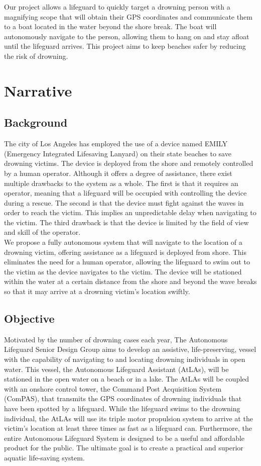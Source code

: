 \documentclass[11pt]{article}
\begin{document}
Our project allows a lifeguard to quickly target a drowning person with a magnifying scope that will obtain their GPS coordinates and communicate them to a boat located in the water beyond the shore break. The boat will autonomously navigate to the person, allowing them to hang on and stay afloat until the lifeguard arrives. This project aims to keep beaches safer by reducing the risk of drowning. 


\section*{Narrative}

\subsection*{Background}
The city of Los Angeles has employed the use of a device named EMILY (Emergency Integrated Lifesaving Lanyard) on their state beaches to save drowning victims. The device is deployed from the shore and remotely controlled by a human operator. Although it offers a degree of assistance, there exist multiple drawbacks to the system as a whole. The first is that it requires an operator, meaning that a lifeguard will be occupied with controlling the device during a rescue. The second is that the device must fight against the waves in order to reach the victim. This implies an unpredictable delay when navigating to the victim. The third drawback is that the device is limited by the field of view and skill of the operator.\\

We propose a fully autonomous system that will navigate to the location of a drowning victim, offering assistance as a lifeguard is deployed from shore. This eliminates the need for a human operator, allowing the lifeguard to swim out to the victim as the device navigates to the victim. The device will be stationed within the water at a certain distance from the shore and beyond the wave breaks so that it may arrive at a drowning victim's location swiftly.

\subsection*{Objective}

Motivated by the number of drowning cases each year, The Autonomous Lifeguard Senior Design Group aims to develop an assistive, life-preserving, vessel with the capability of navigating to and locating drowning individuals in open water. This vessel, the Autonomous Lifeguard Assistant (AtLAs), will be stationed in the open water on a beach or in a lake. The AtLAs will be coupled with an onshore control tower, the Command Post Acquisition System (ComPAS), that transmits the GPS coordinates of drowning individuals that have been spotted by a lifeguard. While the lifeguard swims to the drowning individual, the AtLAs will use its triple motor propulsion system to arrive at the victim's location at least three times as fast as a lifeguard can. Furthermore, the entire Autonomous Lifeguard System is designed to be a useful and affordable product for the public. The ultimate goal is to create a practical and superior aquatic life-saving system.
\end{document}
